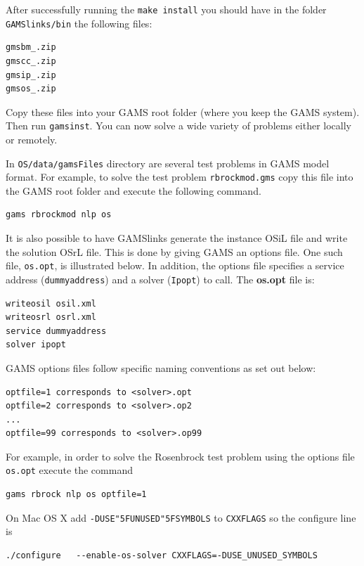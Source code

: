 \documentclass[11pt]{article}
\renewcommand{\_}{{\char"5F}}
\renewcommand{\{}{{\char"7B}}
\renewcommand{\}}{{\char"7D}}
\renewcommand{\^}{{\char"0D}}
\renewcommand{\'}{{\char"0D}}
\begin{document}
\begin{enumerate}[Step 1:]
After successfully running the {\tt make install} you should have in the folder {\tt GAMSlinks/bin} the following files:
\begin{verbatim}
gmsbm_.zip
gmscc_.zip
gmsip_.zip
gmsos_.zip
\end{verbatim}

Copy these  files into your GAMS root folder (where you keep the GAMS system).  Then run {\tt gamsinst}.   You can now solve  a wide variety of  problems either locally or remotely.


In {\tt OS/data/gamsFiles} directory are several test problems in GAMS model format.
 For example, to solve the test problem {\tt rbrockmod.gms} copy this file into the GAMS root folder and execute the following command.

\begin{verbatim}
gams rbrockmod nlp os
\end{verbatim}

It is also possible to have GAMSlinks generate the instance OSiL file and write the solution  OSrL file.
This is done by giving GAMS an options file. One such file, {\tt os.opt}, is illustrated below. In addition,
the options file specifies a service address ({\tt dummyaddress}) and a solver ({\tt Ipopt}) to call.
The {\bf os.opt} file is:

\begin{verbatim}
writeosil osil.xml
writeosrl osrl.xml
service dummyaddress
solver ipopt
\end{verbatim}

GAMS options files follow specific naming conventions as set out below:

\begin{verbatim}
optfile=1 corresponds to <solver>.opt
optfile=2 corresponds to <solver>.op2
...
optfile=99 corresponds to <solver>.op99
\end{verbatim}

For example, in order to solve the Rosenbrock test problem using the  options file  {\tt os.opt}
execute the command

\begin{verbatim}
gams rbrock nlp os optfile=1
\end{verbatim}


 On Mac OS X add   {\tt -DUSE\_UNUSED\_SYMBOLS} to {\tt CXXFLAGS} so the configure line is

\begin{verbatim}
./configure   --enable-os-solver CXXFLAGS=-DUSE_UNUSED_SYMBOLS
\end{verbatim}


\end{enumerate}
\end{document}
